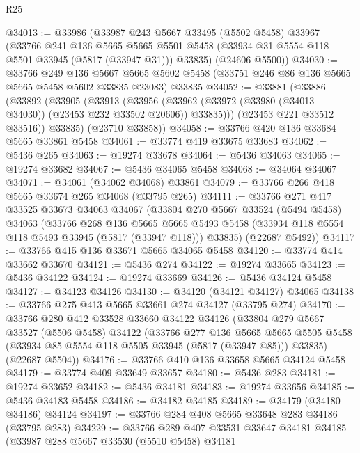 \begin{lexlean}{R25}
\begin{coremodule}
@34013 := @33986
    (@33987
      @243
      @5667
      @33495
      (@5502 @5458)
      @33967
      (@33766
        @241
        @136
        @5665
        @5665
        @5501
        @5458
        (@33934 @31 @5554 @118 @5501 @33945 (@5817 (@33947 @31)))
        @33835)
      (@24606 @5500))
@34030 := @33766
    @249
    @136
    @5667
    @5665
    @5602
    @5458
    (@33751 @246 @86 @136 @5665 @5665 @5458 @5602 @33835 @23083)
    @33835
@34052 := @33881
    (@33886
      (@33892
        (@33905
          (@33913
            (@33956 (@33962 (@33972 (@33980 (@34013 @34030)) (@23453 @232 @33502 @20606)) @33835)))
          (@23453 @221 @33512 @33516))
        @33835)
      (@23710 @33858))
@34058 := @33766 @420 @136 @33684 @5665 @33861 @5458
@34061 := @33774 @419 @33675 @33683
@34062 := @5436 @265
@34063 := @19274 @33678
@34064 := @5436 @34063
@34065 := @19274 @33682
@34067 := @5436 @34065 @5458
@34068 := @34064 @34067
@34071 := @34061 (@34062 @34068) @33861
@34079 := @33766 @266 @418 @5665 @33674 @265 @34068 (@33795 @265)
@34111 := @33766
    @271
    @417
    @33525
    @33673
    @34063
    @34067
    (@33804
      @270
      @5667
      @33524
      (@5494 @5458)
      @34063
      (@33766
        @268
        @136
        @5665
        @5665
        @5493
        @5458
        (@33934 @118 @5554 @118 @5493 @33945 (@5817 (@33947 @118)))
        @33835)
      (@22687 @5492))
@34117 := @33766 @415 @136 @33671 @5665 @34065 @5458
@34120 := @33774 @414 @33662 @33670
@34121 := @5436 @274
@34122 := @19274 @33665
@34123 := @5436 @34122
@34124 := @19274 @33669
@34126 := @5436 @34124 @5458
@34127 := @34123 @34126
@34130 := @34120 (@34121 @34127) @34065
@34138 := @33766 @275 @413 @5665 @33661 @274 @34127 (@33795 @274)
@34170 := @33766
    @280
    @412
    @33528
    @33660
    @34122
    @34126
    (@33804
      @279
      @5667
      @33527
      (@5506 @5458)
      @34122
      (@33766
        @277
        @136
        @5665
        @5665
        @5505
        @5458
        (@33934 @85 @5554 @118 @5505 @33945 (@5817 (@33947 @85)))
        @33835)
      (@22687 @5504))
@34176 := @33766 @410 @136 @33658 @5665 @34124 @5458
@34179 := @33774 @409 @33649 @33657
@34180 := @5436 @283
@34181 := @19274 @33652
@34182 := @5436 @34181
@34183 := @19274 @33656
@34185 := @5436 @34183 @5458
@34186 := @34182 @34185
@34189 := @34179 (@34180 @34186) @34124
@34197 := @33766 @284 @408 @5665 @33648 @283 @34186 (@33795 @283)
@34229 := @33766
    @289
    @407
    @33531
    @33647
    @34181
    @34185
    (@33987
      @288
      @5667
      @33530
      (@5510 @5458)
      @34181

\end{coremodule}
\end{lexlean}
